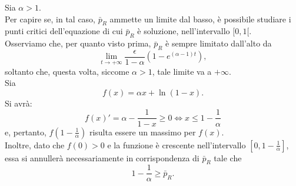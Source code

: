 \documentclass[11pt,largemargins]{homework}
\begin{document}
\begin {alphaparts}
\questionpart
Sia $\alpha>1$.\\
Per capire se, in tal caso, $\bar{p}_{R}$ ammette un limite dal basso, è possibile studiare i punti critici dell'equazione di cui $\bar{p}_{R}$ è soluzione, nell'intervallo $[0,1[$.\\
Osserviamo che, per quanto visto prima, $\bar{p}_{R}$ è sempre limitato dall'alto da
\begin{equation*}
\lim\limits_{t \rightarrow +\infty}\frac{\epsilon}{1-\alpha}\left(1-e^{\left(\alpha-1\right)t}\right),
\end{equation*}
soltanto che, questa volta, siccome $\alpha>1$, tale limite va a $+\infty$.\\
Sia
\begin{equation*}
f\left(x\right)=\alpha x +  \ln{\left(1-x\right)}.
\end{equation*}
Si avrà:
\begin{equation*}
f\left(x\right)'=\alpha - \frac{1}{1-x}\geq 0\Leftrightarrow x\leq 1-\frac{1}{\alpha}
\end{equation*}
e, pertanto, $f\left(1-\frac{1}{\alpha}\right)$ risulta essere un massimo per $f\left(x\right)$.\\Inoltre, dato che $f\left(0\right)>0$ e la funzione è crescente nell'intervallo $[0,1-\frac{1}{\alpha}]$, essa si annullerà necessariamente in corrispondenza di $\bar{p}_{R}$ tale che
\begin{equation*}
1-\frac{1}{\alpha}\geq \bar{p}_{R}.
\end{equation*}  
\end{alphaparts}
\end{document}
